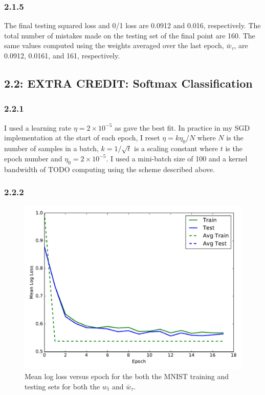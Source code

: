 \documentclass[12pt]{amsart}
\begin{document}
\subsubsection*{2.1.5}
The final testing squared loss and 0/1 loss are 0.0912 and 0.016, respectively.  The total number of mistakes made on the testing set of the final point are 160.  The same values computed using the weights averaged over the last epoch, $\bar{w}_{\tau}$, are 0.0912, 0.0161, and 161, respectively.

\subsection*{2.2: EXTRA CREDIT: Softmax Classification}

\subsubsection*{2.2.1}

I used a learning rate $\eta = 2 \times 10^{-5}$ as gave the best fit.  In practice in my SGD implementation at the start of each epoch, I reset $\eta = k\eta_0/N$ where $N$ is the number of samples in a batch, $k = 1/\sqrt{t}$ is a scaling constant where $t$ is the epoch number and $\eta_0 = 2 \times 10^{-5}$.  I used a mini-batch size of 100 and a kernel bandwidth of TODO computing using the scheme described above.

\subsubsection*{2.2.2}

\begin{figure}[H]
	\includegraphics[width=\columnwidth]{logistic_log_loss.pdf}
    \caption{Mean log loss versus epoch for the both the MNIST training and testing sets for both the $w_t$ and $\bar{w}_{\tau}$.}
    \label{fig:logistic_log_loss}
\end{figure}
\end{document}
